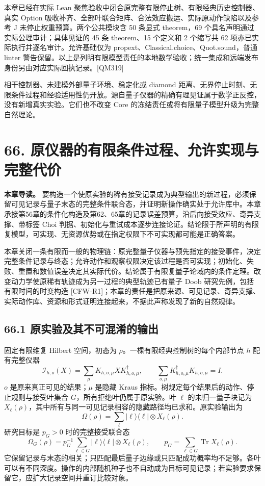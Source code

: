 \documentclass[
  11pt,
  oneside]{book}
\begin{document}
本章已经在实际 Lean
聚焦验收中闭合原完整有限停止树、有限经典历史控制器、真实 Option
吸收补齐、全部叶联合矩阵、合法效应搬运、实际原动作缺陷以及参考 J
未停止权重预算。两个公共模块含 50 条显式 theorem，69
个具名声明通过实际公理审计；具体见证的 45 条 theorem、15 个定义和 2
个缩写共 62 项亦已实际执行并逐名审计。允许基础仅为
propext、Classical.choice、Quot.sound，普通 linter
警告保留。以上是列明有限模型责任的本地数学验收；统一集成和远端发布身份另由对应实际回执记录。{[}QM319{]}

相干控制器、未建模外部量子环境、稳定化或 diamond
距离、无界停止时刻、无限条件过程和经验适用性仍开放。源自量子仪器的精确有理见证属于数学正反控，没有新增真实实验。它们也不改变
Core 的冻结责任或将有限量子模型升级为完整自然理论。

\chapter{66. 原仪器的有限条件过程、允许实现与完整代价}\label{ch-66}\hypertarget{ch-66}{}

\textbf{本章导读。}
要构造一个使原实验的稀有接受记录成为典型输出的新过程，必须保留可见记录与量子末态的完整条件联合态，并证明新操作确实处于允许库中。本章承接第56章的条件化构造及第62、65章的记录误差预算，沿后向接受效应、奇异支撑、带标签
Choi
判据、初始化与重试成本逐步连接论证。结论限于所声明的有限复模型，可实现、无资源优势或在指定权限下不可实现都可能是正确答案。

本章关闭一条有限而一般的物理链：原完整量子仪器与预先指定的接受事件，决定完整条件记录与终态；允许动作和观察权限决定该过程是否可实现；初始化、失败、重置和数值误差决定其实际代价。结论属于有限复量子论域内的条件定理。改变动力学使原稀有轨迹成为另一过程的典型轨迹已有量子
Doob 研究先例，包括有限时间的时变构造
{[}CFW-R1{]}；本章的责任是把原来源、可见记录、奇异支撑、实际动作库、资源和形式证明连接起来，不据此声称发现了新的自然规律。

\section{66.1 原实验及其不可混淆的输出}

固定有限维复 Hilbert 空间，初态为
\(\rho\)。一棵有限经典控制树的每个内部节点 \(h\) 配有完整仪器 \[
\mathcal I_{h,o}(X)=\sum_\mu K_{h,o,\mu}XK_{h,o,\mu}^{\dagger},\qquad
\sum_{o,\mu}K_{h,o,\mu}^{\dagger}K_{h,o,\mu}=I.
\] \(o\) 是原来真正可见的结果；\(\mu\) 是隐藏 Kraus
指标。树规定每个结果后的动作、停止规则与接受叶集合
\(G\)，所有拒绝叶仍属于原实验。叶 \(\ell\) 的未归一量子块记为
\(X_\ell(\rho)\)，其中所有与同一可见记录相容的隐藏路径均已求和。原实验输出为
\[
\Omega(\rho)=\sum_\ell |\ell\rangle\langle\ell|\otimes X_\ell(\rho).
\] 研究目标是 \(p_G>0\) 时的完整接受联合态 \[
\Omega_G(\rho)=p_G^{-1}\sum_{\ell\in G}
 |\ell\rangle\langle\ell|\otimes X_\ell(\rho),\qquad
p_G=\sum_{\ell\in G}\operatorname{Tr}X_\ell(\rho).
\]
它保留记录与末态的相关；只匹配最后量子边缘或只匹配成功概率均不足够。各叶可以有不同深度。操作的内部随机种子也不自动成为目标可见记录；若实验要求保留它，应扩大记录空间并重订比较对象。
\end{document}

